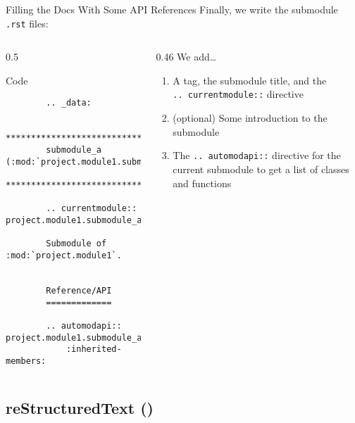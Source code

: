 \begin{frame}[fragile]{Filling the Docs With Some API References}
  Finally, we write the submodule \texttt{.rst} files:

  \begin{columns}[onlytextwidth]
    \begin{column}{0.5\textwidth}
      \begin{block}{Code}
      \footnotesize
      \begin{verbatim}
        .. _data:

        ************************************************
        submodule_a (:mod:`project.module1.submodule_a`)
        ************************************************

        .. currentmodule:: project.module1.submodule_a

        Submodule of :mod:`project.module1`.


        Reference/API
        =============

        .. automodapi:: project.module1.submodule_a
            :inherited-members:
      \end{verbatim}
      \end{block}
    \end{column}
    \hfill
    \begin{column}{0.46\textwidth}
      We add\dots
      \begin{enumerate}
        \setlength{\itemsep}{1.5em}
        \item A tag, the submodule title, and the\\\texttt{.. currentmodule::} directive
        \item (optional) Some introduction to the submodule
        \item The \texttt{.. automodapi::} directive for the current submodule to get a list of
          classes and functions
      \end{enumerate}
    \end{column}
  \end{columns}
\end{frame}


\subsection{reStructuredText (\reST)}

